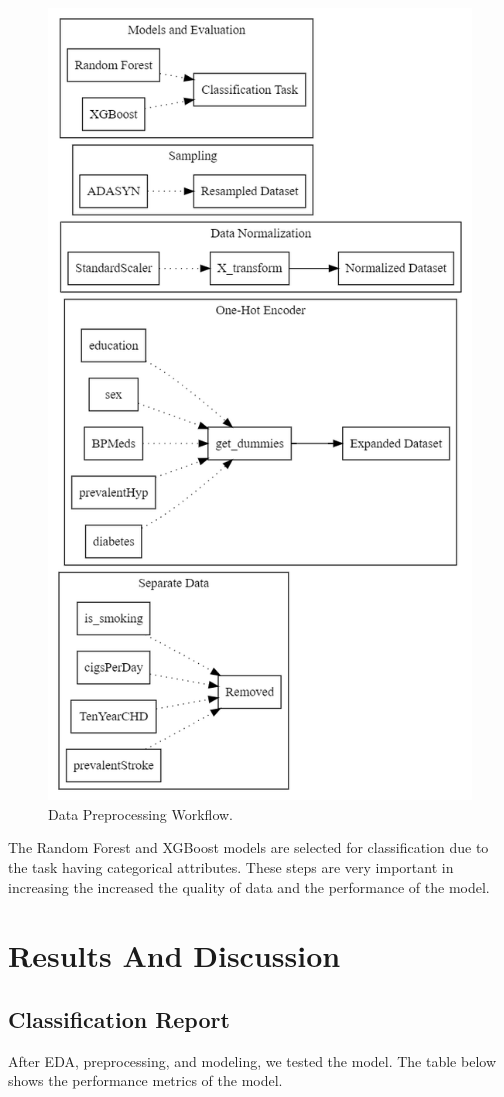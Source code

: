 \documentclass[conference]{IEEEtran}
\begin{document}
\begin{figure}[H]
    \centerline{\includegraphics[width=0.7\linewidth]{fig7.png}}
    \caption{Data Preprocessing Workflow.}
    \label{fig7}
\end{figure}

  The Random Forest and XGBoost models are selected for classification due to the task having categorical attributes. These steps are very important in increasing the increased the quality of data and the performance of the model.

  \section{Results And Discussion}

  \subsection{Classification Report}
  
  After EDA, preprocessing, and modeling, we tested the model. The table below shows the performance metrics of the model.
  
\end{document}
